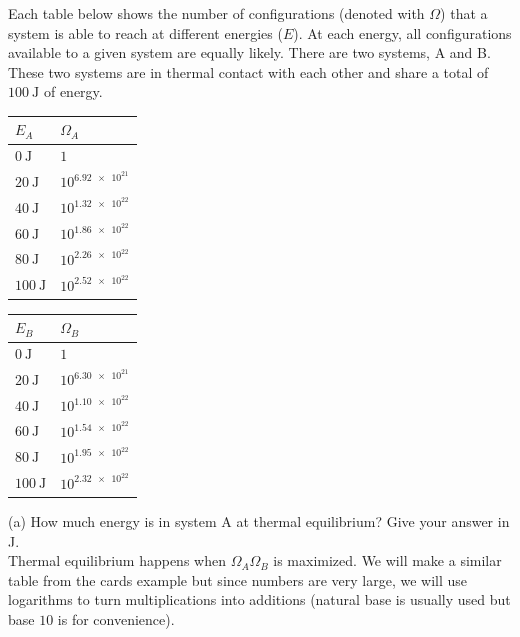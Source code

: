 \begin{texample}
	Each table below shows the number of configurations (denoted with $\Omega$) that a system is able to reach at different energies ($E$). At each energy, all configurations available to a given system are equally likely. There are two systems, A and B. These two systems are in thermal contact with each other and share a total of $\SI{100}{\joule}$ of energy. \\
	
	\begin{center}
		\begin{tabular}{l|l}
			$E_A$ & $\Omega_A$ \\
			\hline
			$\SI{0}{\joule}$ & $1$ \\
			\hline
			$\SI{20}{\joule}$ & $10^{\num{6.92e21}}$ \\
			\hline
			$\SI{40}{\joule}$ & $10^{\num{1.32e22}}$ \\
			\hline
			$\SI{60}{\joule}$ & $10^{\num{1.86e22}}$ \\
			\hline
			$\SI{80}{\joule}$ & $10^{\num{2.26e22}}$ \\
			\hline
			$\SI{100}{\joule}$ & $10^{\num{2.52e22}}$
		\end{tabular}
		\quad
		\begin{tabular}{l|l}
			$E_B$ & $\Omega_B$ \\
			\hline
			$\SI{0}{\joule}$ & $1$ \\
			\hline
			$\SI{20}{\joule}$ & $10^{\num{6.30e21}}$ \\
			\hline
			$\SI{40}{\joule}$ & $10^{\num{1.10e22}}$ \\
			\hline
			$\SI{60}{\joule}$ & $10^{\num{1.54e22}}$ \\
			\hline
			$\SI{80}{\joule}$ & $10^{\num{1.95e22}}$ \\
			\hline
			$\SI{100}{\joule}$ & $10^{\num{2.32e22}}$
		\end{tabular}
	\end{center}
	
	(a) How much energy is in system A at thermal equilibrium? Give your answer in J. \\
	
	Thermal equilibrium happens when $\Omega_A\Omega_B$ is maximized. We will make a similar table from the cards example but since numbers are very large, we will use logarithms to turn multiplications into additions (natural base is usually used but base $10$ is for convenience).
	

\end{texample}
